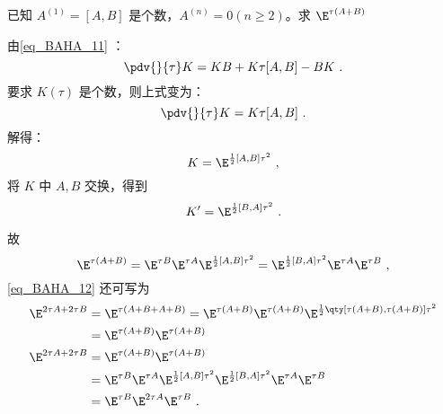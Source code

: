 \begin{example}{}
已知 $A^{(1)}=[A,B]$ 是个数，$A^{(n)}=0(n\geq 2)$。求 $\E^{\tau(A+B)}$

由\autoref{eq_BAHA_11} ：
\begin{equation}
\pdv{}{\tau}K=KB+K\tau[A,B]-BK~.
\end{equation}
要求 $K(\tau)$ 是个数，则上式变为：
\begin{equation}
\pdv{}{\tau}K=K\tau[A,B]~.
\end{equation}
解得：
\begin{equation}
K=\E^{\frac{1}{2}[A,B]\tau^2}~,
\end{equation}
将 $K$ 中 $A,B$ 交换，得到 
\begin{equation}
K'=\E^{\frac{1}{2}[B,A]\tau^2}~.
\end{equation}

故
\begin{equation}\label{eq_BAHA_12}
\E^{\tau(A+B)}=\E^{\tau B}\E^{\tau A}\E^{\frac{1}{2}[A,B]\tau^2}=\E^{\frac{1}{2}[B,A]\tau^2}\E^{\tau A}\E^{\tau B}~,
\end{equation}
\autoref{eq_BAHA_12} 还可写为
\begin{equation}
\begin{aligned}
\E^{2\tau A+2\tau B}&=\E^{\tau(A+B+A+B)}=\E^{\tau (A+B)}\E^{\tau (A+B)}\E^{\frac{1}{2}\qty[\tau(A+B),\tau(A+B)]\tau^2}\\
&=\E^{\tau(A+B)}\E^{\tau(A+B)}\\
\E^{2\tau A+2\tau B}&=\E^{\tau(A+B)}\E^{\tau(A+B)}\\
&=\E^{\tau B}\E^{\tau A}\E^{\frac{1}{2}[A,B]\tau^2}\E^{\frac{1}{2}[B,A]\tau^2}\E^{\tau A}\E^{\tau B}\\
&=\E^{\tau B}\E^{2\tau A}\E^{\tau B}~.
\end{aligned}
\end{equation}
\end{example}

